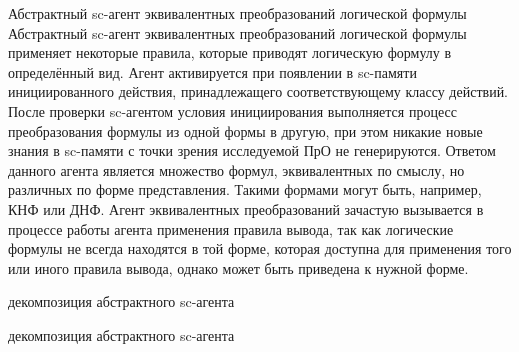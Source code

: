 \begin{frame}{\Large Абстрактный sc-агент эквивалентных преобразований логической формулы}
\topline
\vspace{10mm}
 \\

  Абстрактный sc-агент эквивалентных преобразований логической формулы применяет некоторые правила, которые приводят логическую формулу в определённый вид. Агент активируется при появлении в sc-памяти инициированного действия, принадлежащего соответствующему классу действий. После проверки sc-агентом условия инициирования выполняется процесс преобразования формулы из одной формы в другую, при этом никакие новые знания в sc-памяти с точки зрения исследуемой ПрО не генерируются. Ответом данного агента является множество формул, эквивалентных по смыслу, но различных по форме представления. Такими формами могут быть, например, КНФ или ДНФ. Агент эквивалентных преобразований зачастую вызывается в процессе работы агента применения правила вывода, так как логические формулы не всегда находятся в той форме, которая доступна для применения того или иного правила вывода, однако может быть приведена к нужной форме.  
\end{frame}

\begin{frame}{}
\vspace{15pt}
\begin{SCn}
\begin{scnrelfromset}{декомпозиция абстрактного sc-агента}
\end{scnrelfromset}
\end{SCn}
\end{frame}

\begin{frame}{}
\begin{SCn}
    \begin{scnrelfromset}{декомпозиция абстрактного sc-агента}
\end{scnrelfromset}
\end{SCn}
\end{frame}

